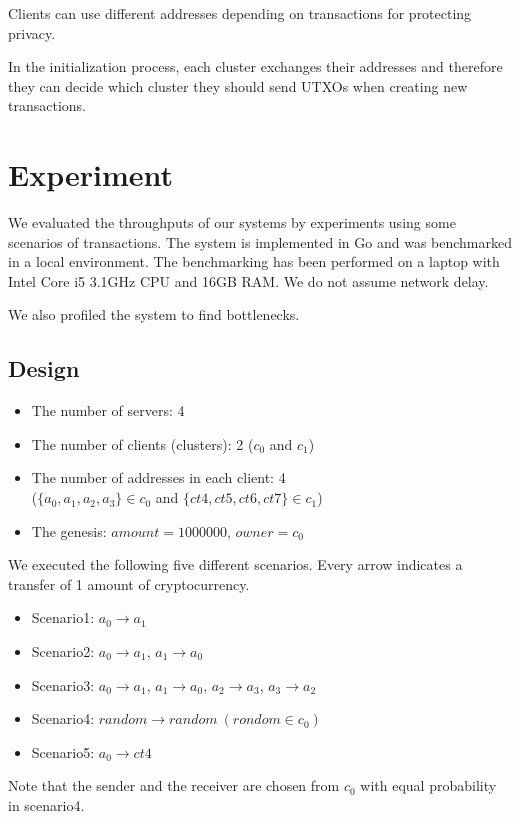 \documentclass[a4paper, oneside]{discothesis}
\begin{document}
Clients can use different addresses depending on transactions for protecting privacy.

In the initialization process, each cluster exchanges their addresses and therefore they can decide which cluster they should send UTXOs when creating new transactions.


\chapter{Experiment}
We evaluated the throughputs of our systems by experiments using some scenarios of transactions.
The system is implemented in Go and was benchmarked in a local environment.
The benchmarking has been performed on a laptop with Intel Core i5 3.1GHz CPU and 16GB RAM.
We do not assume network delay.

We also profiled the system to find bottlenecks.

\section{Design}
\begin{itemize}
    \item The number of servers: 4
    \item The number of clients (clusters): 2 ($c_0$ and $c_1$)
    \item The number of addresses in each client: 4\\
        ($\{a_0, a_1, a_2, a_3\} \in c_0$ and $\{ct4, ct5, ct6, ct7\} \in c_1$)
    \item The genesis: $amount = 1000000$, $owner = c_0$
\end{itemize}

We executed the following five different scenarios.
Every arrow indicates a transfer of 1 amount of cryptocurrency.
\begin{itemize}
    \item Scenario1: $a_0 \rightarrow a_1$
    \item Scenario2: $a_0 \rightarrow a_1$, $a_1 \rightarrow a_0$
    \item Scenario3: $a_0 \rightarrow a_1$, $a_1 \rightarrow a_0$, $a_2 \rightarrow a_3$, $a_3 \rightarrow a_2$
    \item Scenario4: $random \rightarrow random~(rondom \in c_0)$
    \item Scenario5: $a_0 \rightarrow ct4$
\end{itemize}
Note that the sender and the receiver are chosen from $c_0$ with equal probability in scenario4.
\end{document}
